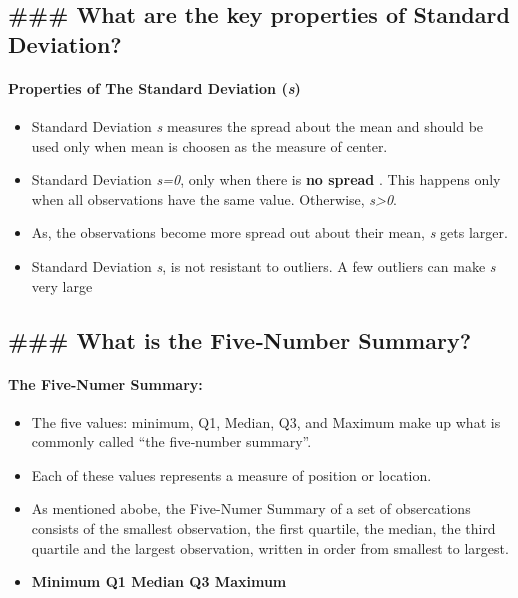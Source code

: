 \documentclass[11pt]{article}
\providecommand{\tightlist}{%
      \setlength{\itemsep}{0pt}\setlength{\parskip}{0pt}}
\begin{document}
    

    \subsection{\#\#\# What are the key properties of Standard
Deviation?}\label{what-are-the-key-properties-of-standard-deviation}

    \paragraph{\texorpdfstring{Properties of The Standard Deviation
(\emph{s})}{Properties of The Standard Deviation (s)}}\label{properties-of-the-standard-deviation-s}

\begin{itemize}
\tightlist
\item
  Standard Deviation \emph{s} measures the spread about the mean and
  should be used only when mean is choosen as the measure of center.
\item
  Standard Deviation \emph{s=0}, only when there is \textbf{no spread} .
  This happens only when all observations have the same value.
  Otherwise, \emph{s\textgreater{}0}.
\item
  As, the observations become more spread out about their mean, \emph{s}
  gets larger.
\item
  Standard Deviation \emph{s}, is not resistant to outliers. A few
  outliers can make \emph{s} very large
\end{itemize}

    \subsection{\#\#\# What is the Five‐Number
Summary?}\label{what-is-the-fivenumber-summary}

    \paragraph{The Five-Numer Summary:}\label{the-five-numer-summary}

\begin{itemize}
\tightlist
\item
  The five values: minimum, Q1, Median, Q3, and Maximum make up what is
  commonly called ``the five‐number summary''.
\item
  Each of these values represents a measure of position or location.
\item
  As mentioned abobe, the Five-Numer Summary of a set of obsercations
  consists of the smallest observation, the first quartile, the median,
  the third quartile and the largest observation, written in order from
  smallest to largest.
\item
  \textbf{Minimum Q1 Median Q3 Maximum}
\end{itemize}
\end{document}
